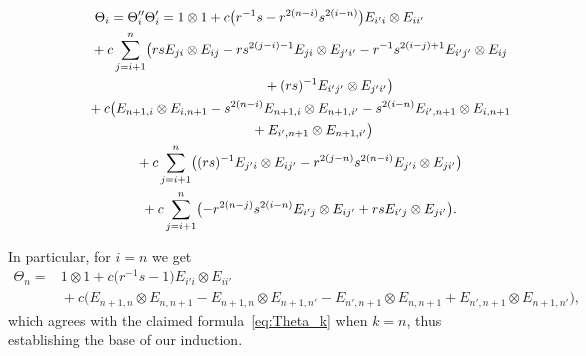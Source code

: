 \documentclass[10pt,a4paper]{amsart}
\numberwithin{equation}{section}
\begin{document}
\begin{gather}
 \Theta_{i} = \Theta_{i}''\Theta_{i}'
 = 1 \otimes 1 + c\bigl(r^{-1}s-r^{2(n - i)}s^{2(i - n)}\bigr) E_{i'i} \otimes E_{ii'} \nonumber\\
 \hphantom{\Theta_{i} = \Theta_{i}''\Theta_{i}'=}{}
 + c\sum_{j = i + 1}^{n}\bigl(rsE_{ji} \otimes E_{ij} - rs^{2(j - i) - 1}E_{ji} \otimes E_{j'i'} - r^{-1}s^{2(i-j) + 1}E_{i'j'} \otimes E_{ij}\nonumber\\
 \hphantom{\Theta_{i} =\Theta_{i}''\Theta_{i}'= + c\sum_{j = i + 1}^{n}\bigl(}{}
 + (rs)^{-1}E_{i'j'} \otimes E_{j'i'}\bigr) \nonumber\\
 \hphantom{\Theta_{i} =\Theta_{i}''\Theta_{i}'= }{}
 + c\bigl(E_{n + 1,i} \otimes E_{i,n+1} - s^{2(n - i)}E_{n + 1,i} \otimes E_{n+1, i'} - s^{2(i - n)}E_{i',n + 1} \otimes E_{i,n + 1}\nonumber\\
 \hphantom{\Theta_{i} =\Theta_{i}''\Theta_{i}'= + c\bigl(}{}
 + E_{i',n + 1} \otimes E_{n + 1,i'} \bigr) \nonumber\\
 \hphantom{\Theta_{i} =\Theta_{i}''\Theta_{i}' =}{}
 + c\sum_{j = i + 1}^{n}\bigl((rs)^{-1}E_{j'i} \otimes E_{ij'} - r^{2(j - n)}s^{2(n - i)}E_{j'i} \otimes E_{ji'} \bigr)\nonumber\\
 \hphantom{\Theta_{i} =\Theta_{i}''\Theta_{i}'= }{}
 +c\sum_{j = i + 1}^{n}\bigl(- r^{2(n - j)}s^{2(i - n)}E_{i'j} \otimes E_{ij'} + rsE_{i'j} \otimes E_{ji'} \bigr).\label{eq:B-individual-Theta}
\end{gather}

In particular, for $i=n$ we get
\begin{align*}
 \Theta_{n}={}&1 \otimes 1 + c\bigl(r^{-1}s-1\bigr) E_{i'i} \otimes E_{ii'}
 \\
 &{}+ c\bigl(E_{n + 1,n} \otimes E_{n,n+1} - E_{n + 1,n} \otimes E_{n+1, n'} - E_{n',n + 1} \otimes E_{n,n + 1} + E_{n',n + 1} \otimes E_{n + 1,n'} \bigr),
\end{align*}
which agrees with the claimed formula~\eqref{eq:Theta_k} when $k = n$, thus establishing the base of our induction.
\end{document}
